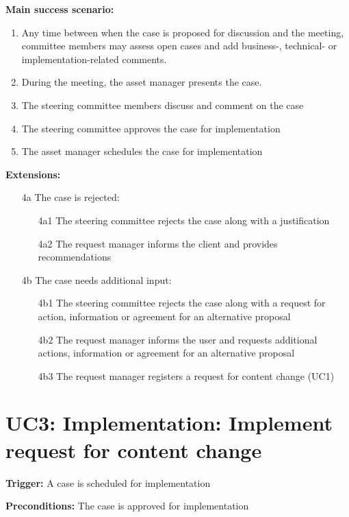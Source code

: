 	\textbf{Main success scenario:}
	
	\begin{enumerate}
		\item Any time between when the case is proposed for discussion and the meeting, committee members may assess open cases and add business-, technical- or implementation-related comments. 
		\item During the meeting, the asset manager presents the case.
		\item The steering committee members discuss and comment on the case
		\item The steering committee approves the case for implementation
		\item The asset manager schedules the case for implementation		
	\end{enumerate}
	\textbf{Extensions:}
	\begin{enumerate}
		\item [4a] The case is rejected:
		\begin{enumerate}
			\item [4a1] The steering committee rejects the case along with a justification
			\item [4a2] The request manager informs the client and provides recommendations			
		\end{enumerate}
		\item [4b] The case needs additional input:
		\begin{enumerate}
			\item [4b1]  The steering committee rejects the case along with a request for action, information or agreement for an alternative proposal
			\item [4b2] The request manager informs the user and requests additional actions, information or agreement for an alternative proposal
			\item [4b3] The request manager registers a request for content change (UC1)
		\end{enumerate}
	\end{enumerate}

	\section{UC3: Implementation: Implement request for content change}
	\label{sec:uc3}
	
	\textbf{Trigger:} A case is scheduled for implementation
	
	\textbf{Preconditions:} The case is approved for implementation
	
